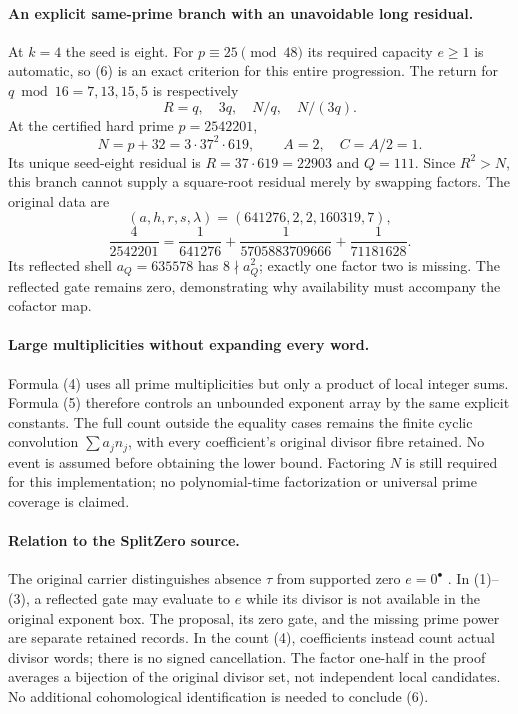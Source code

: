 \documentclass[10pt,a4paper]{article}
\begin{document}
\paragraph{An explicit same-prime branch with an unavoidable long residual.}
At $k=4$ the seed is eight. For $p\equiv25\pmod{48}$ its required capacity
$e\ge1$ is automatic, so (6) is an exact criterion for this entire progression.
The return for $q\bmod16=7,13,15,5$ is respectively
\[
 R=q,\quad3q,\quad N/q,\quad N/(3q).
\]
At the certified hard prime $p=2542201$,
\[
 N=p+32=3\cdot37^2\cdot619,\qquad A=2,\quad C=A/2=1.
\]
Its unique seed-eight residual is $R=37\cdot619=22903$ and $Q=111$.
Since $R^2>N$, this branch cannot supply a square-root residual merely by
swapping factors. The original data are
\[
 (a,h,r,s,\lambda)=(641276,2,2,160319,7),
\]
\[
 \boxed{\frac4{2542201}
 =\frac1{641276}+\frac1{5705883709666}+\frac1{71181628}.}
\]
Its reflected shell $a_Q=635578$ has $8\nmid a_Q^2$; exactly one factor two
is missing. The reflected gate remains zero, demonstrating why availability
must accompany the cofactor map.

\paragraph{Large multiplicities without expanding every word.}
Formula (4) uses all prime multiplicities but only a product of local integer
sums. Formula (5) therefore controls an unbounded exponent array by the same
explicit constants. The full count outside the equality cases remains the
finite cyclic convolution $\sum a_jn_j$, with every coefficient's original
divisor fibre retained. No event is assumed before obtaining the lower bound.
Factoring $N$ is still required for this implementation; no polynomial-time
factorization or universal prime coverage is claimed.

\paragraph{Relation to the SplitZero source.}
The original carrier distinguishes absence $\tau$ from supported zero
$e=0^\bullet$ \cite{Previous}. In (1)--(3), a reflected gate may evaluate to
$e$ while its divisor is not available in the original exponent box. The
proposal, its zero gate, and the missing prime power are separate retained
records. In the count (4), coefficients instead count actual divisor words;
there is no signed cancellation. The factor one-half in the proof averages a
bijection of the original divisor set, not independent local candidates.
No additional cohomological identification is needed to conclude (6).
\end{document}
